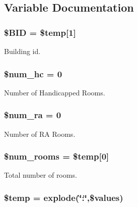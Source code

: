 \subsection{\-Variable \-Documentation}
\hypertarget{upRooms_8php_a7458cf5c1cfaeb93fe055362ecff999e}{
\subsubsection[{\$\-B\-I\-D}]{\setlength{\rightskip}{0pt plus 5cm}\$\-B\-I\-D = \$temp\mbox{[}1\mbox{]}}}\label{upRooms_8php_a7458cf5c1cfaeb93fe055362ecff999e}
\-Building id. \hypertarget{upRooms_8php_a0676c3aab4512e850c0778fdc42ea183}{
\subsubsection[{\$num\-\_\-hc}]{\setlength{\rightskip}{0pt plus 5cm}\$num\-\_\-hc = 0}}\label{upRooms_8php_a0676c3aab4512e850c0778fdc42ea183}
\-Number of \-Handicapped \-Rooms. \hypertarget{upRooms_8php_aaf1cd7ce3153edff129df3a57ab81c2f}{
\subsubsection[{\$num\-\_\-ra}]{\setlength{\rightskip}{0pt plus 5cm}\$num\-\_\-ra = 0}}\label{upRooms_8php_aaf1cd7ce3153edff129df3a57ab81c2f}
\-Number of \-R\-A \-Rooms. \hypertarget{upRooms_8php_ad51cf907141b35051a8d4123b3e7e259}{
\subsubsection[{\$num\-\_\-rooms}]{\setlength{\rightskip}{0pt plus 5cm}\$num\-\_\-rooms = \$temp\mbox{[}0\mbox{]}}}\label{upRooms_8php_ad51cf907141b35051a8d4123b3e7e259}
\-Total number of rooms. \hypertarget{upRooms_8php_a0d57fb0317e19ec798aa625381ebf342}{
\subsubsection[{\$temp}]{\setlength{\rightskip}{0pt plus 5cm}\$temp = explode(\char`\"{}\-:\char`\"{},\$values)}}\label{upRooms_8php_a0d57fb0317e19ec798aa625381ebf342}

